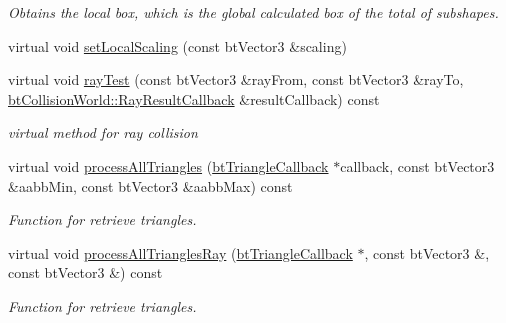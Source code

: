\begin{CompactItemize}
\begin{CompactList}\small\item\em Obtains the local box, which is the global calculated box of the total of subshapes. \item\end{CompactList}\item 
virtual void \hyperlink{classbt_g_impact_shape_interface_dec0bd43cd0105b1d0dc172bc7db50d8}{setLocalScaling} (const btVector3 \&scaling)
\item 
\hypertarget{classbt_g_impact_shape_interface_87aac603f1fcd40f3c1cfe0d6f8baf16}{
virtual void \hyperlink{classbt_g_impact_shape_interface_87aac603f1fcd40f3c1cfe0d6f8baf16}{rayTest} (const btVector3 \&rayFrom, const btVector3 \&rayTo, \hyperlink{structbt_collision_world_1_1_ray_result_callback}{btCollisionWorld::RayResultCallback} \&resultCallback) const }
\label{classbt_g_impact_shape_interface_87aac603f1fcd40f3c1cfe0d6f8baf16}

\begin{CompactList}\small\item\em virtual method for ray collision \item\end{CompactList}\item 
virtual void \hyperlink{classbt_g_impact_shape_interface_2faf9adce39854a9a66dd658f646be25}{processAllTriangles} (\hyperlink{classbt_triangle_callback}{btTriangleCallback} $\ast$callback, const btVector3 \&aabbMin, const btVector3 \&aabbMax) const 
\begin{CompactList}\small\item\em Function for retrieve triangles. \item\end{CompactList}\item 
virtual void \hyperlink{classbt_g_impact_shape_interface_646ad13b4aa116d58df110c2f407e5a8}{processAllTrianglesRay} (\hyperlink{classbt_triangle_callback}{btTriangleCallback} $\ast$, const btVector3 \&, const btVector3 \&) const 
\begin{CompactList}\small\item\em Function for retrieve triangles. \item\end{CompactList}\end{CompactItemize}
